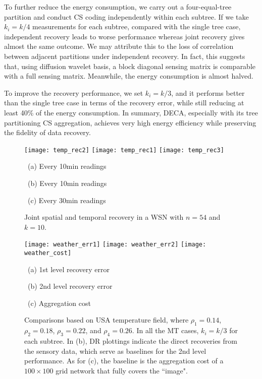 \documentclass[conference]{IEEEtran}
\begin{document}
    To further reduce the energy consumption, we carry out a four-equal-tree partition and conduct CS coding independently within each subtree. If we take $k_i=k/4$ measurements for each subtree, compared with the single tree case, independent recovery leads to worse performance whereas joint recovery gives almost the same outcome. We may attribute this to the loss of correlation between adjacent partitions under independent recovery. In fact, this suggests that, using diffusion wavelet basis, a block diagonal sensing matrix is comparable with a full sensing matrix. Meanwhile, the energy consumption is almost halved.

    To improve the recovery performance, we set $k_i=k/3$, and it performs better than the single tree case in terms of the recovery error, while still reducing at least 40\% of the energy consumption. In summary, DECA, especially with its tree partitioning CS aggregation, achieves very high energy efficiency while preserving the fidelity of data recovery.

    \begin{figure*}[t]
      \begin{minipage}{\textwidth}
      \begin{center}
        \texttt{[image: temp\_rec2]}
        \texttt{[image: temp\_rec1]}
        \texttt{[image: temp\_rec3]}
        \parbox{.329\textwidth}{\center\scriptsize~(a) Every 10min readings}
        \parbox{.327\textwidth}{\center\scriptsize~(b) Every 10min readings}
        \parbox{.329\textwidth}{\center\scriptsize~(c) Every 30min readings}
\caption{Joint spatial and temporal recovery in a WSN with $n=54$ and $k=10$.}
        \label{fig:temprec}
      \end{center}
      \end{minipage}
      \begin{minipage}{\textwidth}
      \begin{center}
        \texttt{[image: weather\_err1]}
	    \texttt{[image: weather\_err2]}
        \texttt{[image: weather\_cost]}
        \parbox{.33\textwidth}{\center\scriptsize~(a) 1st level recovery error}
        \parbox{.33\textwidth}{\center\scriptsize~(b) 2nd level recovery error}
        \parbox{.327\textwidth}{\center\scriptsize~(c) Aggregation cost}
\caption{Comparisons based on USA temperature field, where $\rho_1=0.14$, $\rho_2=0.18$, $\rho_3=0.22$, and $\rho_4=0.26$. In all the MT cases, $k_i=k/3$ for each subtree. In (b), DR plottings indicate the direct recoveries from the sensory data, which serve as baselines for the 2nd level performance. As for (c), the baseline is the aggregation cost of a $100\times100$ grid network that fully covers the ``image".}
        \label{fig:weathercomp}
      \end{center}
      \end{minipage}
\end{figure*}
\end{document}
